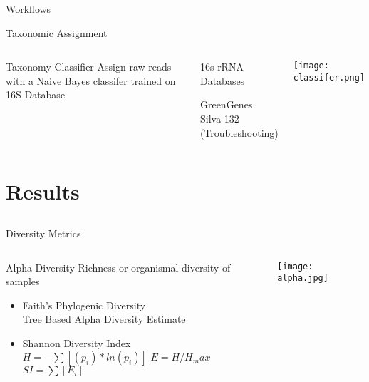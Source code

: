 \documentclass[11pt]{beamer}
\begin{document}
	\begin{frame}{Workflows}

	\begin{block}{Taxonomic Assignment}
	\end{block}
	\begin{columns}
	\begin{block}{Taxonomy Classifier}
	Assign raw reads with a Naive Bayes classifer trained on 16S Database
	\end{block}
	
	\begin{block}{16s rRNA Databases}
	
	GreenGenes 
	\\
	Silva 132 (Troubleshooting)
	
	\end{block}

	
	
	\texttt{[image: classifer.png]}
	
	
	
	\end{columns}
	\end{frame}
	
	
	
\section{Results}
\subsection{}
	
	
	
	\begin{frame}{Diversity Metrics}
	\begin{columns}
	\column{0.4\textwidth}
	\hspace{2cm}
	\begin{block}{Alpha Diversity}
	Richness or organismal diversity of samples
	\begin{itemize}
	\item Faith's Phylogenic Diversity \\ 
	Tree Based Alpha Diversity Estimate
	
	\item Shannon Diversity Index\\
	$H = -\sum[(p_i) * ln(p_i)]$
  $E=H/H_max$
  $SI = \sum[E_i]$
  
  
  \end{itemize}
  \end{block}
  
	\column{0.7\textwidth}
	\centering
	\texttt{[image: alpha.jpg]}
	\end{columns}
	\end{frame}
	
\end{document}
